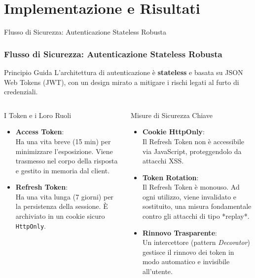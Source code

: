 \documentclass[8pt]{beamer}
\begin{document}
\section{Implementazione e Risultati}

\begin{frame}{Flusso di Sicurezza: Autenticazione Stateless Robusta}
  \frametitle{Flusso di Sicurezza: Autenticazione Stateless Robusta}

  \begin{block}{Principio Guida}
    L'architettura di autenticazione è \textbf{stateless} e basata su JSON Web Tokens (JWT), con un design mirato a mitigare i rischi legati al furto di credenziali.
  \end{block}

  \begin{columns}[T]
    \begin{exampleblock}{I Token e i Loro Ruoli}
      \begin{itemize}
        \item \textbf{Access Token}:\\Ha una vita breve (15 min) per minimizzare l'esposizione. Viene trasmesso nel corpo della risposta e gestito in memoria dal client.

        \item \textbf{Refresh Token}:\\Ha una vita lunga (7 giorni) per la persistenza della sessione. È archiviato in un cookie sicuro \texttt{HttpOnly}.
      \end{itemize}
    \end{exampleblock}

    \begin{alertblock}{Misure di Sicurezza Chiave}
      \begin{itemize}
        \item \textbf{Cookie HttpOnly}:\\Il Refresh Token non è accessibile via JavaScript, proteggendolo da attacchi XSS.

        \item \textbf{Token Rotation}:\\Il Refresh Token è \alert{monouso}. Ad ogni utilizzo, viene invalidato e sostituito, una misura fondamentale contro gli attacchi di tipo *replay*.

        \item \textbf{Rinnovo Trasparente}:\\Un intercettore (pattern \textit{Decorator}) gestisce il rinnovo dei token in modo automatico e invisibile all'utente.
      \end{itemize}
    \end{alertblock}
  \end{columns}
\end{frame}
\end{document}
